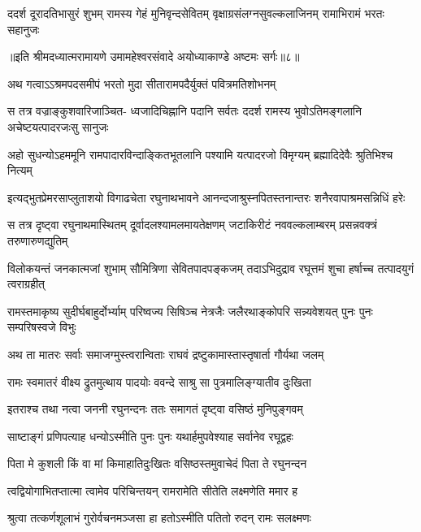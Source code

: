 \fourlineindentedshloka
{ददर्श दूरादतिभासुरं शुभम्}
{रामस्य गेहं मुनिवृन्दसेवितम्}
{वृक्षाग्रसंलग्नसुवल्कलाजिनम्}
{रामाभिरामं भरतः सहानुजः} %

{॥इति श्रीमदध्यात्मरामायणे उमामहेश्वरसंवादे
अयोध्याकाण्डे अष्टमः सर्गः॥८॥
}




\twolineshloka
{अथ गत्वाऽऽश्रमपदसमीपं भरतो मुदा}
{सीतारामपदैर्युक्तं पवित्रमतिशोभनम्} %

\fourlineindentedshloka
{स तत्र वज्राङ्कुशवारिजाञ्चित-}
{ध्वजादिचिह्नानि पदानि सर्वतः}
{ददर्श रामस्य भुवोऽतिमङ्गलानि}
{अचेष्टयत्पादरजःसु सानुजः} %

\fourlineindentedshloka
{अहो सुधन्योऽहममूनि}
{रामपादारविन्दाङ्कितभूतलानि}
{पश्यामि यत्पादरजो विमृग्यम्}
{ब्रह्मादिदेवैः श्रुतिभिश्च नित्यम्} %

\fourlineindentedshloka
{इत्यद्भुतप्रेमरसाप्लुताशयो}
{विगाढचेता रघुनाथभावने}
{आनन्दजाश्रुस्नपितस्तनान्तरः}
{शनैरवापाश्रमसन्निधिं हरेः} %

\fourlineindentedshloka
{स तत्र दृष्ट्वा रघुनाथमास्थितम्}
{दूर्वादलश्यामलमायतेक्षणम्}
{जटाकिरीटं नववल्कलाम्बरम्}
{प्रसन्नवक्त्रं तरुणारुणद्युतिम्} %

\fourlineindentedshloka
{विलोकयन्तं जनकात्मजां शुभाम्}
{सौमित्रिणा सेवितपादपङ्कजम्}
{तदाऽभिदुद्राव रघूत्तमं शुचा}
{हर्षाच्च तत्पादयुगं त्वराग्रहीत्} %

\fourlineindentedshloka
{रामस्तमाकृष्य सुदीर्घबाहुर्दोर्भ्याम्}
{परिष्वज्य सिषिञ्च नेत्रजैः}
{जलैरथाङ्कोपरि सन्न्यवेशयत्}
{पुनः पुनः सम्परिषस्वजे विभुः} %

\twolineshloka
{अथ ता मातरः सर्वाः समाजग्मुस्त्वरान्विताः}
{राघवं द्रष्टुकामास्तास्तृषार्ता गौर्यथा जलम्} %

\twolineshloka
{रामः स्वमातरं वीक्ष्य द्रुतमुत्थाय पादयोः}
{ववन्दे साश्रु सा पुत्रमालिङ्ग्यातीव दुःखिता} %

\twolineshloka
{इतराश्च तथा नत्वा जननी रघुनन्दनः}
{ततः समागतं दृष्ट्वा वसिष्ठं मुनिपुङ्गवम्} %

\twolineshloka
{साष्टाङ्गं प्रणिपत्याह धन्योऽस्मीति पुनः पुनः}
{यथार्हमुपवेश्याह सर्वानेव रघूद्वहः} %

\twolineshloka
{पिता मे कुशली किं वा मां किमाहातिदुःखितः}
{वसिष्ठस्तमुवाचेदं पिता ते रघुनन्दन} %

\twolineshloka
{त्वद्वियोगाभितप्तात्मा त्वामेव परिचिन्तयन्}
{रामरामेति सीतेति लक्ष्मणेति ममार ह} %

\twolineshloka
{श्रुत्वा तत्कर्णशूलाभं गुरोर्वचनमञ्जसा}
{हा हतोऽस्मीति पतितो रुदन् रामः सलक्ष्मणः} %

